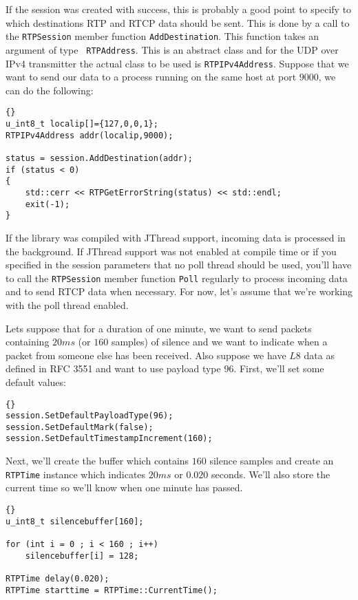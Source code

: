 \documentclass[12pt,a4paper]{article}
\begin{document}
			If the session was created with success, this is probably a good
			point to specify to which destinations RTP and RTCP data should be
			sent. This is done by a call to the {\tt RTPSession} member function
			{\tt AddDestination}. This function takes an argument of type {\tt
			RTPAddress}. This is an abstract class and for the UDP over IPv4
			transmitter the actual class to be used is {\tt RTPIPv4Address}.
			Suppose that we want to send our data to a process running on the
			same host at port $9000$, we can do the following:
			\begin{lstlisting}[frame=tb]{}
u_int8_t localip[]={127,0,0,1};
RTPIPv4Address addr(localip,9000);

status = session.AddDestination(addr);
if (status < 0)
{
	std::cerr << RTPGetErrorString(status) << std::endl;
	exit(-1);
}
			\end{lstlisting}

			If the library was compiled with JThread support, incoming data is
			processed in the background. If JThread support was not enabled at
			compile time or if you specified in the session parameters that no
			poll thread should be used, you'll have to call the {\tt RTPSession}
			member function {\tt Poll} regularly to process incoming data and
			to send RTCP data when necessary. For now, let's assume that we're
			working with the poll thread enabled.

			Lets suppose that for a duration of one minute, we want to send
			packets containing $20 ms$ (or $160$ samples) of silence and we want
			to indicate when a packet from someone else has been received. Also
			suppose we have $L8$ data as defined in RFC 3551 and want to use
			payload type $96$. First, we'll set some default values:
			\begin{lstlisting}[frame=tb]{}
session.SetDefaultPayloadType(96);
session.SetDefaultMark(false);
session.SetDefaultTimestampIncrement(160);
			\end{lstlisting}

			Next, we'll create the buffer which contains $160$ silence samples
			and create an {\tt RTPTime} instance which indicates $20 ms$ or
			$0.020$ seconds. We'll also store the current time so we'll know
			when one minute has passed.
			\begin{lstlisting}[frame=tb]{}
u_int8_t silencebuffer[160];

for (int i = 0 ; i < 160 ; i++)
	silencebuffer[i] = 128;

RTPTime delay(0.020);
RTPTime starttime = RTPTime::CurrentTime();
			\end{lstlisting}
\end{document}
